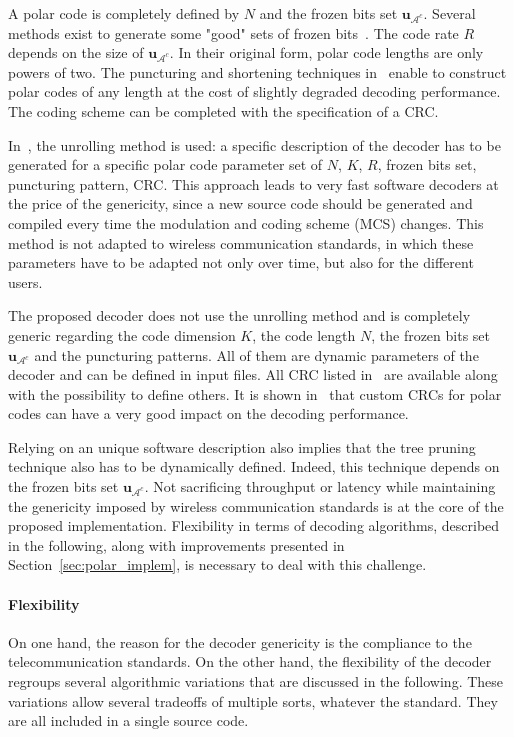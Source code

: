 A polar code is completely defined by $N$ and the frozen bits set
$\bm{u}_{\mathcal{A}^c}$. Several methods exist to generate some "good" sets of
frozen bits~\cite{Tal2013,Trifonov2012}. The code rate $R$ depends on the size
of $\bm{u}_{\mathcal{A}^c}$. In their original form, polar code lengths are only
powers of two. The puncturing and shortening techniques
in~\cite{Wang2014,Niu2013,Miloslavskaya2015} enable to construct polar codes of
any length at the cost of slightly degraded decoding performance. The coding
scheme can be completed with the specification of a CRC.

In~\cite{Sarkis2016}, the unrolling method is used: a specific description of
the decoder has to be generated for a specific polar code parameter set of $N$,
$K$, $R$, frozen bits set, puncturing pattern, CRC. This approach leads to very
fast software decoders at the price of the genericity, since a new source code
should be generated and compiled every time the modulation and coding scheme
(MCS) changes. This method is not adapted to wireless communication standards,
in which these parameters have to be adapted not only over time, but also for
the different users.

The proposed decoder does not use the unrolling method and is completely generic
regarding the code dimension $K$, the code length $N$, the frozen bits set
$\bm{u}_{\mathcal{A}^c}$ and the puncturing patterns. All of them are dynamic
parameters of the decoder and can be defined in input files. All CRC listed
in~\cite{CRCWiki2017} are available along with the possibility to define others.
It is shown in~\cite{Zhang2017} that custom CRCs for polar codes can have a very
good impact on the decoding performance.

Relying on an unique software description also implies that the tree pruning
technique also has to be dynamically defined. Indeed, this technique depends on
the frozen bits set $\bm{u}_{\mathcal{A}^c}$. Not sacrificing throughput or
latency while maintaining the genericity imposed by wireless communication
standards is at the core of the proposed implementation. Flexibility in terms of
decoding algorithms, described in the following, along with improvements
presented in Section~\ref{sec:polar_implem}, is necessary to deal with this
challenge.

\paragraph{Flexibility}

On one hand, the reason for the decoder genericity is the compliance to the
telecommunication standards. On the other hand, the flexibility of the decoder
regroups several algorithmic variations that are discussed in the following.
These variations allow several tradeoffs of multiple sorts, whatever the
standard. They are all included in a single source code.


